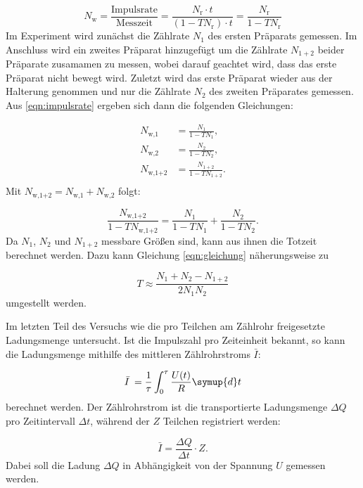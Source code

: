 \begin{equation}
N_{\text{w}} = \frac{\text{Impulsrate}}{\text{Messzeit}} = \frac{N_{\text{r}} \cdot t}{(1-TN_{\text{r}})\cdot t} = \frac{N_{\text{r}}}{1-TN_{\text{r}}}
\label{eqn:impulsrate}
\end{equation}
Im Experiment wird zunächst die Zählrate $N_1$ des ersten Präparats gemessen. Im Anschluss wird ein zweites Präparat hinzugefügt um die Zählrate $N_{1+2}$ beider Präparate zusamamen zu messen, wobei darauf geachtet wird, dass das erste Präparat nicht bewegt wird.
Zuletzt wird das erste Präparat wieder aus der Halterung genommen und nur die Zählrate $N_2$ des zweiten Präparates gemessen. Aus \ref{eqn:impulsrate} ergeben sich dann die folgenden Gleichungen:

\begin{equation}
\begin{aligned}
N_{\text{w,1}} &= \frac{N_1}{1 - TN_1}, \\
N_{\text{w,2}} &= \frac{N_2}{1 - TN_2}, \\
N_{\text{w,1+2}} &= \frac{N_{1+2}}{1 - TN_{1+2}}. \\
\end{aligned}
\end{equation}
Mit $N_{\text{w,1+2}} = N_{\text{w,1}} + N_{\text{w,2}}$ folgt:

\begin{equation}
\frac{N_{\text{w,1+2}}}{1 - TN_{\text{w,1+2}}} = \frac{N_1}{1 - TN_1} + \frac{N_2}{1 - TN_2}.
\label{eqn:gleichung}
\end{equation}
Da $N_1$, $N_2$ und $N_{1+2}$ messbare Größen sind, kann aus ihnen die Totzeit berechnet werden. Dazu kann Gleichung \ref{eqn:gleichung} näherungsweise zu

\begin{equation}
T \approx \frac{N_1 + N_2 - N_{1+2}}{2N_1 N_2}
\end{equation}
umgestellt werden.

Im letzten Teil des Versuchs wie die pro Teilchen am Zählrohr freigesetzte Ladungsmenge untersucht. Ist die Impulszahl pro Zeiteinheit bekannt, so kann die Ladungsmenge mithilfe des mittleren Zählrohrstroms $\bar{I}$:

\begin{equation}
\bar{I} \:= \frac{1}{\tau} \int_0^\tau \frac{U(t)}{R} \symup{d}t
\end{equation}
berechnet werden. Der Zählrohrstrom ist die transportierte Ladungsmenge $\Delta Q$ pro Zeitintervall $\Delta t$, während der $Z$ Teilchen registriert werden:

\begin{equation}
\bar{I} = \frac{\Delta Q}{\Delta t}\cdot Z.
\end{equation}
Dabei soll die Ladung $\Delta Q$ in Abhängigkeit von der Spannung $U$ gemessen werden.